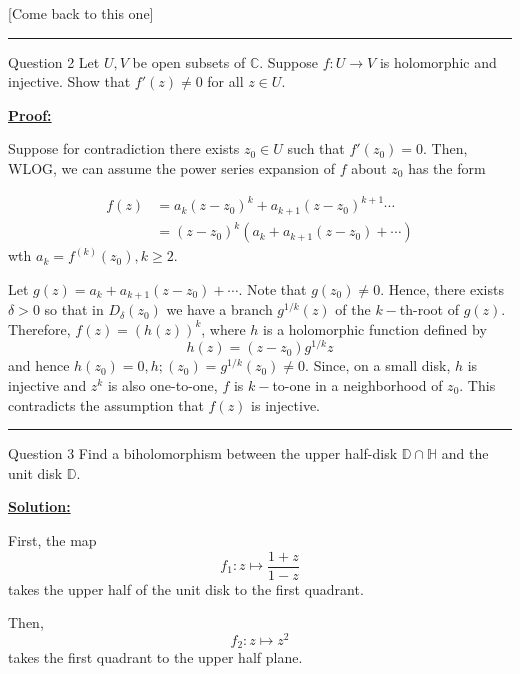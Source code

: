 \documentclass{article}
\newcommand{\C}{\mathbb{C}}
\begin{document}
[Come back to this one]


\vskip 0.5cm
\hrule 
\vskip 0.5cm


\begin{mathdefinitionbox}{Question 2}
\vskip 0.5cm
Let $U, V$ be open subsets of $\C$. Suppose $f : U \rightarrow V$ is holomorphic and injective. Show that $f'(z) \neq 0$ for all $z \in U$. 
\end{mathdefinitionbox}

\vskip 0.5cm
\underline{\textbf{Proof:}}

Suppose for contradiction there exists $z_0 \in U$ such that $f'(z_0) = 0$. Then, WLOG, we can assume the power series expansion of $f$ about $z_0$ has the form 

\begin{align*}
  f(z) &= a_k(z-z_0)^k + a_{k+1}(z-z_0)^{k+1} \cdots \\
  &= \left(z-z_0\right)^k \left( a_k + a_{k+1} (z - z_0) + \cdots \right)
\end{align*}
wth $a_k = f^{(k)}(z_0), k \geq 2$.

Let $g(z) = a_k + a_{k+1}(z-z_0) + \cdots$. Note that $g(z_0) \neq 0$. Hence, there exists $\delta > 0$ so that in $D_{\delta}(z_0)$ we have a branch $g^{1/k}(z)$ of the $k-$th-root of $g(z)$. Therefore, $f(z) = \left(h(z)\right)^k$, where $h$ is a holomorphic function defined by 
\[ h(z) = (z-z_0) g^{1/k}z \] and hence $h(z_0) = 0, h;(z_0) = g^{1/k}(z_0) \neq 0$. Since, on a small disk, $h$ is injective and $z^k$ is also one-to-one, $f$ is $k-$to-one in a neighborhood of $z_0$. This contradicts the assumption that $f(z)$ is injective.


\vskip 0.5cm
\hrule 
\vskip 0.5cm


\begin{mathdefinitionbox}{Question 3}
\vskip 0.5cm
Find a biholomorphism between the upper half-disk $\mathbb{D} \cap \mathbb{H}$ and the unit disk $\mathbb{D}$.
\end{mathdefinitionbox}

\vskip 0.5cm
\underline{\textbf{Solution:}}

First, the map 
\[f_1 :  z \mapsto \frac{1+z}{1-z} \] takes the upper half of the unit disk to the first quadrant. 

Then, 
\[ f_2 : z \mapsto z^2  \] takes the first quadrant to the upper half plane.
\end{document}

